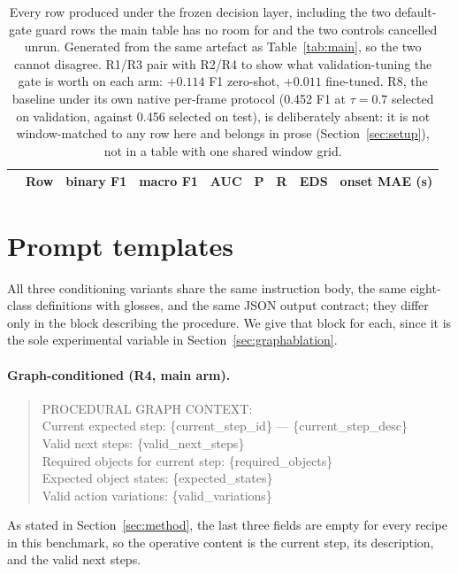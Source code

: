\documentclass[10pt,twocolumn]{article}
\begin{document}
\begin{table}[!t]
\centering\footnotesize
\setlength{\tabcolsep}{5pt}
\begin{tabular}{@{}llccccccc@{}}
\toprule
& Row & binary F1 & macro F1 & AUC & P & R & EDS & onset MAE (s)\\
\midrule

\end{tabular}
\caption{Every row produced under the frozen decision layer, including
the two default-gate guard rows the main table has no room for and the two
controls cancelled unrun. Generated from the same artefact as
Table~\ref{tab:main}, so the two cannot disagree. R1/R3 pair with R2/R4 to show
what validation-tuning the gate is worth on each arm: $+0.114$ F1 zero-shot,
$+0.011$ fine-tuned. R8, the baseline under its own native per-frame protocol
(0.452 F1 at $\tau=0.7$ selected on validation, against 0.456 selected on test),
is deliberately absent: it is not window-matched to any row here and belongs in
prose (Section~\ref{sec:setup}), not in a table with one shared window grid.}
\label{tab:register}
\end{table}

\section{Prompt templates}
\label{app:prompts}

All three conditioning variants share the same instruction body, the same
eight-class definitions with glosses, and the same JSON output contract; they
differ only in the block describing the procedure. We give that block for each,
since it is the sole experimental variable in Section~\ref{sec:graphablation}.

\paragraph{Graph-conditioned (R4, main arm).}
\begin{quote}\footnotesize\ttfamily
PROCEDURAL GRAPH CONTEXT:\\
Current expected step: \{current\_step\_id\} --- \{current\_step\_desc\}\\
Valid next steps: \{valid\_next\_steps\}\\
Required objects for current step: \{required\_objects\}\\
Expected object states: \{expected\_states\}\\
Valid action variations: \{valid\_variations\}
\end{quote}
As stated in Section~\ref{sec:method}, the last three fields are empty for every
recipe in this benchmark, so the operative content is the current step, its
description, and the valid next steps.
\end{document}
